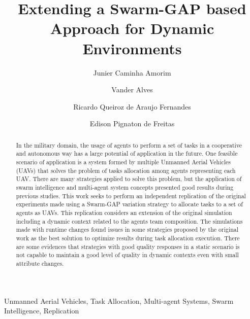 \documentclass[review]{elsarticle}
\newcommand{\uav}{UAV}
\newcommand{\uavs}{UAVs}
\begin{document}
\begin{frontmatter}
	
\title{Extending a Swarm-GAP based Approach for Dynamic Environments}

\author[unbaddress]{Junier Caminha Amorim}

\author[unbaddress]{Vander Alves}

\author[brazilianarmyaddress]{Ricardo Queiroz de Araujo Fernandes}

\author[ufrgsaddress]{Edison Pignaton de Freitas}

\address[unbaddress]{Computation Science Department University of Brasilia, Brazil}
\address[ufrgsaddress]{Institute of Informatics Federal University of Rio Grande do Sul, Brazil}
\address[brazilianarmyaddress]{Software Development Center - Brazilian Army, Brazil}

\begin{abstract}
In the military domain, the usage of agents to perform a set of tasks in a cooperative and autonomous way has a large potential of application in the future. One feasible scenario of application is a system formed by multiple Unmanned Aerial Vehicles (\uavs) that solves the problem of tasks allocation among agents representing each \uav. There are many strategies applied to solve this problem, but the application of swarm intelligence and multi-agent system concepts presented good results during previous studies. This work seeks to perform an independent replication of the original experiments made using a Swarm-GAP variation strategy to allocate tasks to a set of agents as \uavs. This replication considers an extension of the original simulation including a dynamic context related to the agents team composition. The simulations made with runtime changes found issues in some strategies proposed by the original work as the best solution to optimize results during task allocation execution. There are some evidences that strategies with good quality responses in a static scenario is not capable to maintain a good level of quality in dynamic contexts even with small attribute changes.

\end{abstract}

\begin{keyword}
Unmanned Aerial Vehicles, Task Allocation, Multi-agent Systems, Swarm Intelligence, Replication
\end{keyword}

\end{frontmatter}
\end{document}
